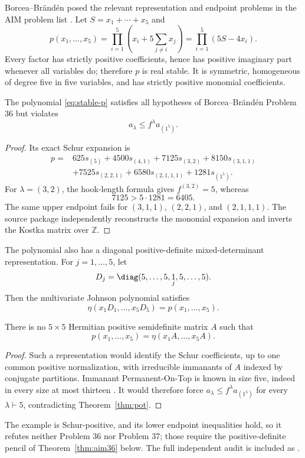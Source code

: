 Borcea--Br\"and\'en posed the relevant representation and endpoint problems in the AIM problem list \citeyearpar{AIMStableProblems}.  Let $S=x_1+\cdots+x_5$ and
\begin{equation}\label{eq:stable-p}
p(x_1,\ldots,x_5)=\prod_{i=1}^5\left(x_i+5\sum_{j\ne i}x_j\right)=\prod_{i=1}^5(5S-4x_i).
\end{equation}
Every factor has strictly positive coefficients, hence has positive imaginary part whenever all variables do; therefore $p$ is real stable.  It is symmetric, homogeneous of degree five in five variables, and has strictly positive monomial coefficients.

\begin{theorem}\label{thm:pot}
The polynomial \eqref{eq:stable-p} satisfies all hypotheses of Borcea--Br\"and\'en Problem 36 but violates
\[
a_\lambda\le f^\lambda a_{(1^5)}.
\]
\end{theorem}
\begin{proof}
Its exact Schur expansion is
\begin{align*}
p={}&625s_{(5)}+4500s_{(4,1)}+7125s_{(3,2)}+8150s_{(3,1,1)}\\
&+7525s_{(2,2,1)}+6580s_{(2,1,1,1)}+1281s_{(1^5)}.
\end{align*}
For $\lambda=(3,2)$, the hook-length formula gives $f^{(3,2)}=5$, whereas
\[
7125>5\cdot1281=6405.
\]
The same upper endpoint fails for $(3,1,1)$, $(2,2,1)$, and $(2,1,1,1)$.  The source package independently reconstructs the monomial expansion and inverts the Kostka matrix over $\mathbb Z$.
\end{proof}

The polynomial also has a diagonal positive-definite mixed-determinant representation.  For $j=1,\ldots,5$, let
\[
D_j=\diag(5,\ldots,5,\underset{j}{1},5,\ldots,5).
\]
Then the multivariate Johnson polynomial satisfies
\[
\eta(x_1D_1,\ldots,x_5D_5)=p(x_1,\ldots,x_5).
\]

\begin{theorem}\label{thm:common-A}
There is no $5\times5$ Hermitian positive semidefinite matrix $A$ such that
\[
p(x_1,\ldots,x_5)=\eta(x_1A,\ldots,x_5A).
\]
\end{theorem}
\begin{proof}
Such a representation would identify the Schur coefficients, up to one common positive normalization, with irreducible immanants of $A$ indexed by conjugate partitions.  Immanant Permanent-On-Top is known in size five, indeed in every size at most thirteen \cite{Wanless2022}.  It would therefore force
$a_\lambda\le f^\lambda a_{(1^5)}$ for every $\lambda\vdash5$, contradicting Theorem~\ref{thm:pot}.
\end{proof}

\begin{remark}[Scope]
The example is Schur-positive, and its lower endpoint inequalities hold, so it refutes neither Problem 36 nor Problem 37; those require the positive-definite pencil of Theorem~\ref{thm:aim36} below.  The full independent audit is included as .
\end{remark}
